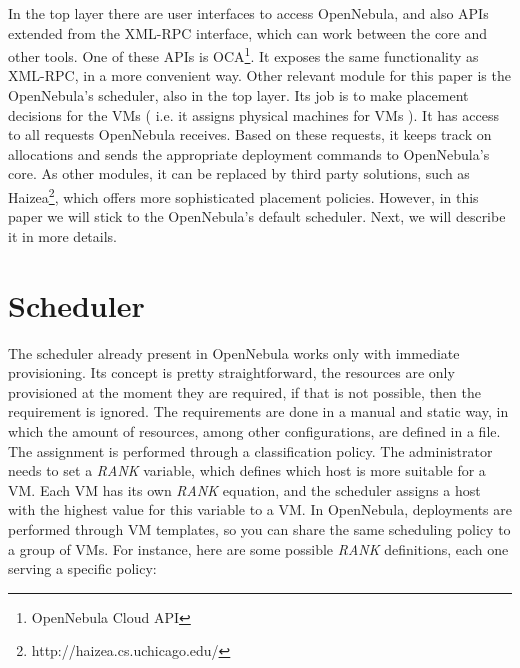 In the top layer there are user interfaces to access OpenNebula, and also APIs extended from the XML-RPC interface, which can work between the core and other tools. One of these APIs is  OCA\footnote{OpenNebula Cloud API}. It exposes the same functionality as XML-RPC, in a more convenient way. Other relevant module for this paper is the OpenNebula's scheduler, also in the top layer. Its job is to make placement decisions for the VMs ( i.e. it assigns physical machines for VMs ). It has access to all requests OpenNebula receives. Based on these requests, it keeps track on allocations and sends the appropriate deployment commands to OpenNebula's core. As other modules, it can be replaced by third party solutions, such as Haizea\footnote{http://haizea.cs.uchicago.edu/},  which offers more sophisticated placement policies. However, in this paper we will stick to the OpenNebula's default scheduler. Next, we will describe it in more details.

\section{Scheduler}

The scheduler already present in OpenNebula works only with immediate provisioning. Its concept is pretty straightforward, the resources are only provisioned at the moment they are required, if that is not possible, then the requirement is ignored. The requirements are done in a manual and static way, in which the amount of resources, among other configurations, are defined in a file. The assignment is performed through a classification policy.  The administrator needs to set a \textit{RANK} variable, which defines which host is more suitable for a VM. Each VM has its own \textit{RANK} equation, and the scheduler assigns a host with the highest value for this variable to a VM. In OpenNebula, deployments are performed through VM templates, so you can share the same scheduling policy  to a group of VMs. For instance, here are some possible \textit{RANK} definitions, each one serving a specific policy:


